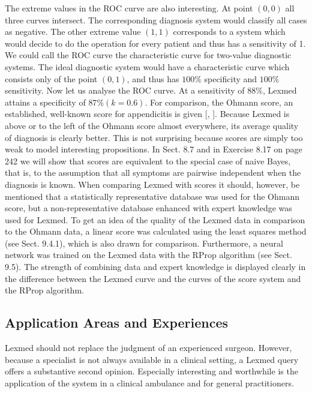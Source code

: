 \documentclass[10pt]{book}
\begin{document}
The extreme values in the ROC curve are also interesting. At point $(0,0)$ all three curves intersect. The corresponding diagnosis system would classify all cases as negative. The other extreme value $(1,1)$ corresponds to a system which would decide to do the operation for every patient and thus has a sensitivity of 1. We could call the ROC curve the characteristic curve for two-value diagnostic systems. The ideal diagnostic system would have a characteristic curve which consists only of the point $(0,1)$, and thus has $100 \%$ specificity and $100 \%$ sensitivity.
Now let us analyse the ROC curve. At a sensitivity of $88 \%$, Lexmed attains a specificity of $87 \%(k=0.6)$. For comparison, the Ohmann score, an established, well-known score for appendicitis is given [\cite{omyl96}, \cite{zsr99}]. Because Lexmed is above or to the left of the Ohmann score almost everywhere, its average quality of diagnosis is clearly better. This is not surprising because scores are simply too weak to model interesting propositions. In Sect. 8.7 and in Exercise 8.17 on page 242 we will show that scores are equivalent to the special case of naive Bayes, that is, to the assumption that all symptoms are pairwise independent when the diagnosis is known. When comparing Lexmed with scores it should, however, be mentioned that a statistically representative database was used for the Ohmann score, but a non-representative database enhanced with expert knowledge was used for Lexmed. To get an idea of the quality of the Lexmed data in comparison to the Ohmann data, a linear score was calculated using the least squares method (see Sect. 9.4.1), which is also drawn for comparison. Furthermore, a neural network was trained on the Lexmed data with the RProp algorithm (see Sect. 9.5). The strength of combining data and expert knowledge is displayed clearly in the difference between the Lexmed curve and the curves of the score system and the RProp algorithm.

\subsection{Application Areas and Experiences}
Lexmed should not replace the judgment of an experienced surgeon. However, because a specialist is not always available in a clinical setting, a Lexmed query offers a substantive second opinion. Especially interesting and worthwhile is the application of the system in a clinical ambulance and for general practitioners.
\end{document}
